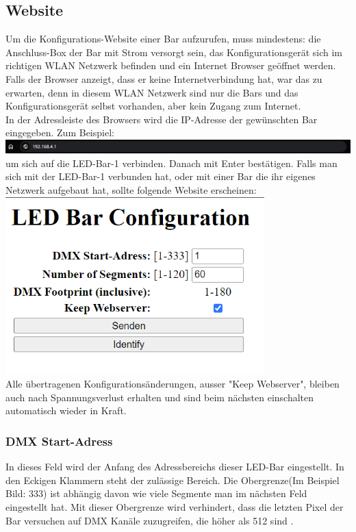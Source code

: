 \documentclass{article}
\begin{document}
\subsection{Website}
Um die Konfigurations-Website einer Bar aufzurufen, muss mindestens: die Anschluss-Box der Bar mit Strom versorgt sein, das Konfigurationsgerät sich im richtigen WLAN Netzwerk befinden und ein Internet Browser geöffnet werden. Falls der Browser anzeigt, dass er keine Internetverbindung hat, war das zu erwarten, denn in diesem WLAN Netzwerk sind nur die Bars und das Konfigurationsgerät selbst vorhanden, aber kein Zugang zum Internet.\\
In der Adressleiste des Browsers wird die IP-Adresse der gewünschten Bar eingegeben. Zum Beispiel:\\
\includegraphics[width = \textwidth]{Browser_Adressleiste}\\
um sich auf die LED-Bar-1 verbinden. Danach mit Enter bestätigen. Falls man sich mit der LED-Bar-1 verbunden hat, oder mit einer Bar die ihr eigenes Netzwerk aufgebaut hat, sollte folgende Website erscheinen:\\
\includegraphics[width = 10cm]{Website_Main_AP}\\
Alle übertragenen Konfigurationsänderungen, ausser "Keep Webserver", bleiben auch nach Spannungsverlust erhalten und sind beim nächsten einschalten automatisch wieder in Kraft.
\subsubsection{DMX Start-Adress}
In dieses Feld wird der Anfang des Adressbereichs dieser LED-Bar eingestellt. In den Eckigen Klammern steht der zulässige Bereich. Die Obergrenze(Im Beispiel Bild: 333) ist abhängig davon wie viele Segmente man im nächsten Feld eingestellt hat. Mit dieser Obergrenze wird verhindert, dass die letzten Pixel der Bar versuchen auf DMX Kanäle zuzugreifen, die höher als 512 sind .
\end{document}
